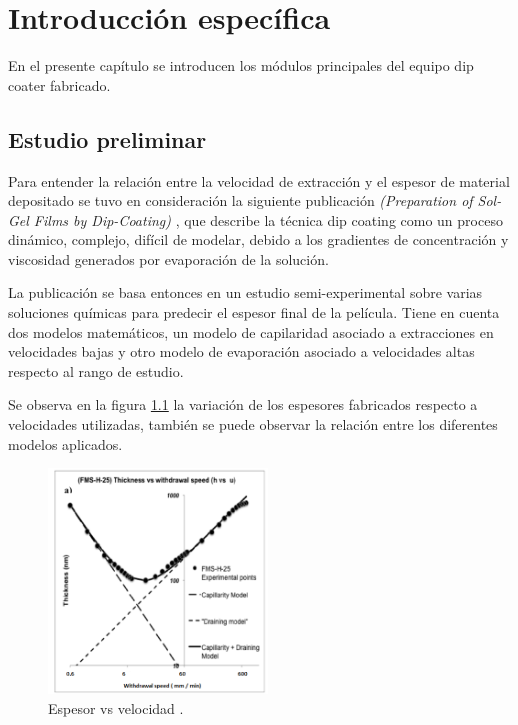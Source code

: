 
\chapter{Introducción específica} %

\label{Chapter2} %

En el presente capítulo se introducen los módulos principales del equipo dip coater fabricado.   

\section{Estudio preliminar}

Para entender la relación entre la velocidad de extracción y el espesor de material depositado se tuvo en consideración la siguiente publicación \textit{(Preparation of Sol-Gel Films by Dip-Coating)} \cite{paper_galo}, que describe la técnica dip coating como un proceso dinámico, complejo, difícil de modelar, debido a los gradientes de concentración y viscosidad generados por evaporación de la solución. 


La publicación se basa entonces en un estudio semi-experimental sobre varias soluciones químicas para predecir el espesor final de la película. Tiene en cuenta dos modelos matemáticos, un modelo de capilaridad asociado a extracciones en velocidades bajas y otro modelo de evaporación asociado a velocidades altas respecto al rango de estudio. 

Se observa en la figura \ref{fig:paper_galo} la variación de los espesores fabricados respecto a velocidades utilizadas, también se puede observar la relación entre los diferentes modelos aplicados. 

\begin{figure}[!h]
\centering 
\includegraphics[width=0.52\textwidth]{./Figures/paper_galo.png}
\caption{Espesor vs velocidad \protect\footnotemark.}
\label{fig:paper_galo}
\end{figure}


